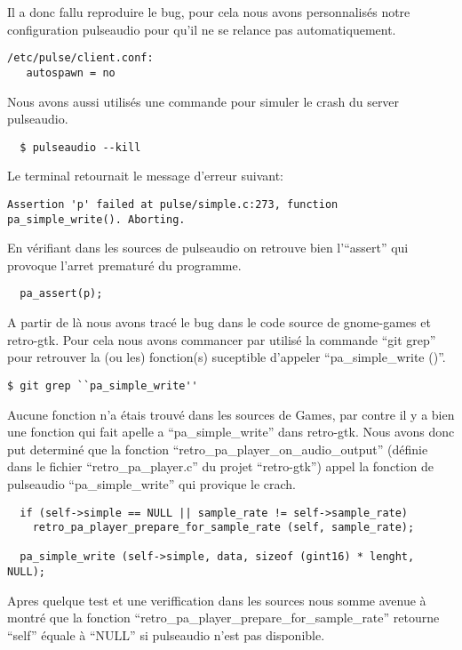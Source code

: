 \documentclass[12pt]{report}
\begin{document}
Il a donc fallu reproduire le bug, pour cela nous avons personnalisés notre
configuration pulseaudio pour qu'il ne se relance pas automatiquement.
\begin{verbatim}
/etc/pulse/client.conf:
   autospawn = no
\end{verbatim}

Nous avons aussi utilisés une commande pour simuler le crash du server pulseaudio.
\begin{verbatim}
  $ pulseaudio --kill
\end{verbatim}

Le terminal retournait le message d'erreur suivant:
\begin{verbatim}
Assertion 'p' failed at pulse/simple.c:273, function pa_simple_write(). Aborting.
\end{verbatim}

En vérifiant dans les sources de pulseaudio on retrouve bien l'``assert'' qui provoque
l'arret prematuré du programme.
\begin{verbatim}
  pa_assert(p);
\end{verbatim}

A partir de là nous avons tracé le bug dans le code source de gnome-games et retro-gtk.
Pour cela nous avons commancer par utilisé la commande ``git grep'' pour retrouver
la (ou les) fonction(s) suceptible d'appeler ``pa\_simple\_write ()''.
\begin{verbatim}
$ git grep ``pa_simple_write''
\end{verbatim}

Aucune fonction n'a étais trouvé dans les sources de Games, par contre il y a bien
une fonction qui fait apelle a ``pa\_simple\_write'' dans retro-gtk.
Nous avons donc put determiné que la fonction
``retro\_pa\_player\_on\_audio\_output'' (définie dans le fichier
``retro\_pa\_player.c'' du projet ``retro-gtk'') appel la fonction de pulseaudio
``pa\_simple\_write'' qui provique le crach.
\begin{verbatim}
  if (self->simple == NULL || sample_rate != self->sample_rate)
    retro_pa_player_prepare_for_sample_rate (self, sample_rate);

  pa_simple_write (self->simple, data, sizeof (gint16) * lenght, NULL);
\end{verbatim}

Apres quelque test et une veriffication dans les sources nous somme avenue à montré
que la fonction ``retro\_pa\_player\_prepare\_for\_sample\_rate'' retourne ``self''
équale à ``NULL'' si pulseaudio n'est pas disponible.
\end{document}
